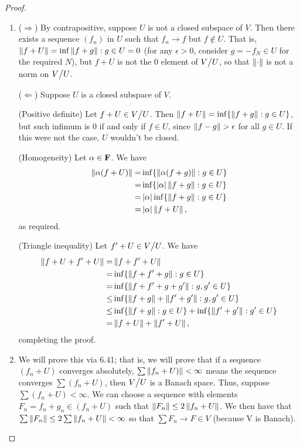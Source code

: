 \begin{proof}
\begin{enumerate}
    \item ($\Rightarrow$)
    By contrapositive, suppose $U$ is not a closed subspace of $V$.
    Then there exists a sequence $(f_n)$ in $U$ such that $f_n \to f$ but $f \notin U$.
    That is, $\left\lVert f + U\right\rVert = \inf{\left\lVert f + g\right\rVert: g \in U} = 0$ (for any $\epsilon > 0$, consider $g = -f_N \in U$ for the required $N$), but $f + U$ is not the 0 element of ${\textstyle V}\big/{\textstyle U}$, so that $\left\lVert \cdot\right\rVert$ is not a norm on ${\textstyle V}\big/{\textstyle U}$.

    ($\Leftarrow$)
    Suppose $U$ is a closed subspace of $V$.

    (Positive definite) 
    Let $f + U \in {\textstyle V}\big/{\textstyle U}$.
    Then $\left\lVert f + U\right\rVert = \inf\{\left\lVert f + g\right\rVert: g \in U\}$, but such infimum is 0 if and only if $f \in U$, since $\left\lVert f - g\right\rVert > \epsilon$ for all $g \in U$.
    If this were not the case, $U$ wouldn't be closed.

    (Homogeneity)
    Let $\alpha \in \mathbf{F}$.
    We have 
    \begin{align*}
        \left\lVert \alpha(f + U)\right\rVert 
        =& \inf\{\left\lVert \alpha(f + g)\right\rVert: g \in U\}\\
        =& \inf\{\left\lvert \alpha\right\rvert\left\lVert f + g\right\rVert: g \in U\}\\
        =& \left\lvert \alpha\right\rvert \inf\{\left\lVert f + g\right\rVert: g \in U\}\\
        =& \left\lvert \alpha\right\rvert\left\lVert f + U\right\rVert,
    \end{align*}
    as required.

    (Triangle inequality)
    Let $f' + U \in {\textstyle V}\big/{\textstyle U}$.
    We have
    \begin{align*}
        \left\lVert f + U + f' + U\right\rVert
        =& \left\lVert f + f' + U\right\rVert\\
        =& \inf\{\left\lVert f + f' + g\right\rVert: g \in U\}\\
        =& \inf\{\left\lVert f + f' + g + g'\right\rVert: g, g' \in U\}\\
        \leq& \inf\{\left\lVert f + g\right\rVert + \left\lVert f' + g'\right\rVert: g, g' \in U\}\\
        \leq& \inf\{\left\lVert f + g\right\rVert: g \in U\} + \inf\{\left\lVert f' + g'\right\rVert: g' \in U\}\\
        =& \left\lVert f + U\right\rVert + \left\lVert f' + U\right\rVert,
    \end{align*}
    completing the proof.

    \item We will prove this via 6.41;
    that is, we will prove that if a sequence $(f_n + U)$ converges absolutely, $\sum \left\lVert f_n + U)\right\rVert < \infty$ means the sequence converges $\sum (f_n + U)$, then ${\textstyle V}\big/{\textstyle U}$ is a Banach space.
    Thus, suppose $\sum (f_n + U) < \infty$.
    We can choose a sequence with elements $F_n = f_n + g_n \in  (f_n + U)$ such that $\left\lVert F_n\right\rVert \leq 2\left\lVert f_n + U\right\rVert$.
    We then have that $\sum \left\lVert F_n\right\rVert \leq 2\sum \left\lVert f_n + U\right\rVert < \infty$ so that $\sum F_n \to F \in V$ (because V is Banach).


\end{enumerate}
\end{proof}
